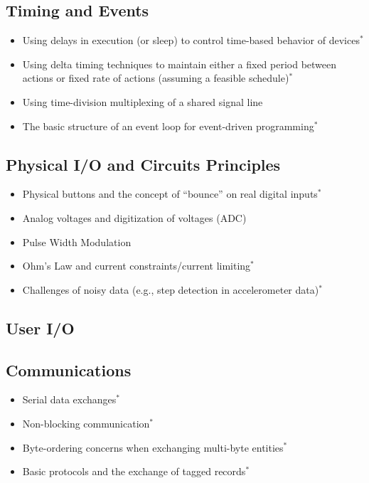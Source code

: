 \subsection{Timing and Events}
\label{sec:time}
\begin{itemize}
  \item Using delays in execution (or sleep) to control time-based behavior of devices$^*$
  \item Using delta timing techniques to maintain either a fixed period between actions or fixed rate of actions (assuming a feasible schedule)$^*$
  \item Using time-division multiplexing of a shared signal line
  \item The basic structure of an event loop for event-driven programming$^*$
\end{itemize}

\subsection{Physical I/O and Circuits Principles}
\label{sec:pio}
\begin{itemize}
  \item Physical buttons and the concept of ``bounce'' on real digital inputs$^*$
  \item Analog voltages and digitization of voltages (ADC)
  \item Pulse Width Modulation
  \item Ohm's Law and current constraints/current limiting$^*$
  \item Challenges of noisy data (e.g., step detection in accelerometer data)$^*$
\end{itemize}

\subsection{User I/O}
\label{sec:uio}

\subsection{Communications}
\label{sec:comm}
\begin{itemize}
  \item Serial data exchanges$^*$
  \item Non-blocking communication$^*$
  \item Byte-ordering concerns when exchanging multi-byte entities$^*$
  \item Basic protocols and the exchange of tagged records$^*$
\end{itemize}

